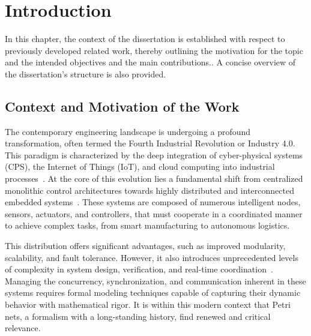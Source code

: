 
%

\chapter{Introduction}
\label{cha:introduction}


\epigraphfontsize{\small\itshape}
\setlength\epigraphwidth{12.5cm}
\setlength\epigraphrule{0pt}

In this chapter, the context of the dissertation is established with respect to previously developed related work, thereby outlining the motivation for the topic and the intended objectives and the main contributions.. A concise overview of the dissertation’s structure is also provided.

\section{Context and Motivation of the Work}
\label{sec:context_and_motivation_of_the_work}


The contemporary engineering landscape is undergoing a profound transformation, often termed the Fourth Industrial Revolution or Industry 4.0. This paradigm is characterized by the deep integration of cyber-physical systems (CPS), the Internet of Things (IoT), and cloud computing into industrial processes~\cite{Kagermann2013}. At the core of this evolution lies a fundamental shift from centralized monolithic control architectures towards highly distributed and interconnected embedded systems~\cite{Lee2017}. These systems are composed of numerous intelligent nodes, sensors, actuators, and controllers, that must cooperate in a coordinated manner to achieve complex tasks, from smart manufacturing to autonomous logistics.

This distribution offers significant advantages, such as improved modularity, scalability, and fault tolerance. However, it also introduces unprecedented levels of complexity in system design, verification, and real-time coordination~\cite{AlFuqaha2015}. Managing the concurrency, synchronization, and communication inherent in these systems requires formal modeling techniques capable of capturing their dynamic behavior with mathematical rigor. It is within this modern context that Petri nets, a formalism with a long-standing history, find renewed and critical relevance.

